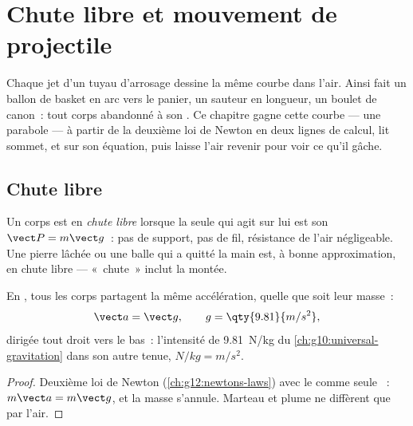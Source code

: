 \chapter{Chute libre et mouvement de projectile}\label{ch:g12:projectile-motion}

Chaque jet d'un tuyau d'arrosage dessine la même courbe dans l'air.
Ainsi fait un ballon de basket en arc vers le panier, un sauteur en
longueur, un boulet de canon~: tout corps abandonné à son
. Ce chapitre gagne cette courbe --- une parabole ---
à partir de la deuxième loi de Newton en deux lignes de
calcul, lit sommet,  et  sur son
équation, puis laisse l'air revenir pour voir ce qu'il gâche.

\section{Chute libre}

\begin{definition}\label{def:g12:projectile-motion:freefall}
Un corps est en \emph{chute libre} lorsque la seule
 qui agit sur lui est son
 $\vect P = m\vect g$~: pas de support, pas de
fil, résistance de l'air négligeable. Une pierre lâchée ou une balle
qui a quitté la main est, à bonne approximation, en chute libre ---
«~chute~» inclut la montée.
\end{definition}

\begin{theorem}\label{thm:g12:projectile-motion:galileo}
En , tous les corps partagent la même
accélération, quelle que soit leur masse~:
\[
\vect a = \vect g, \qquad g = \qty{9.81}{m/s^2},
\]
dirigée tout droit vers le bas~: l'intensité de
 \qty{9.81}{N/kg} du
\cref{ch:g10:universal-gravitation} dans son autre tenue,
$\unit{N/kg} = \unit{m/s^2}$.
\end{theorem}

\begin{proof}
Deuxième loi de Newton (\cref{ch:g12:newtons-laws}) avec le
 comme seule ~:
$m\vect a = m\vect g$, et la masse s'annule. Marteau et plume ne
diffèrent que par l'air.
\end{proof}

